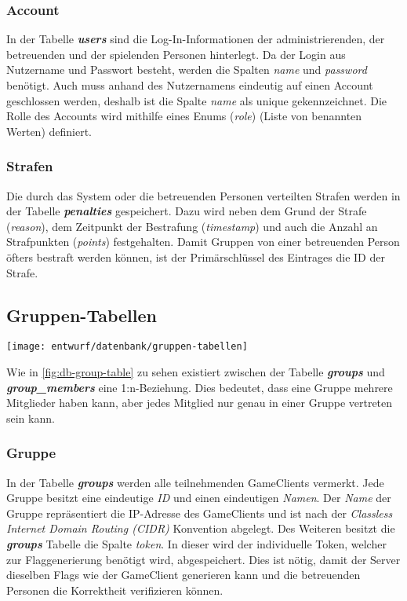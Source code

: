\subsubsection{Account}
In der Tabelle \textbf{\textit{users}} sind die Log-In-Informationen der administrierenden, der betreuenden und der spielenden Personen hinterlegt. Da der Login aus Nutzername und Passwort besteht, werden die Spalten \textit{name} und \textit{password} benötigt. Auch muss anhand des Nutzernamens eindeutig auf einen Account geschlossen werden, deshalb ist die Spalte \textit{name} als unique gekennzeichnet. Die Rolle des Accounts wird mithilfe eines Enums (\textit{role}) (Liste von benannten Werten) definiert.

\subsubsection{Strafen}
Die durch das System oder die betreuenden Personen verteilten Strafen werden in der Tabelle \textbf{\textit{penalties}} gespeichert. Dazu wird neben dem Grund der Strafe (\textit{reason}), dem Zeitpunkt der Bestrafung (\textit{timestamp}) und auch die Anzahl an Strafpunkten (\textit{points}) festgehalten. Damit Gruppen von einer betreuenden Person öfters bestraft werden können, ist der Primärschlüssel des Eintrages die ID der Strafe.

\subsection{Gruppen-Tabellen}
\begin{center}
	\texttt{[image: entwurf/datenbank/gruppen-tabellen]}
	\label{fig:db-group-table}
\end{center}

Wie in \autoref{fig:db-group-table} zu sehen existiert zwischen der Tabelle \textbf{\textit{groups}} und \textbf{\textit{group\_members}} eine 1:n-Beziehung. Dies bedeutet, dass eine Gruppe mehrere Mitglieder haben kann, aber jedes Mitglied nur genau in einer Gruppe vertreten sein kann.

\subsubsection{Gruppe}
In der Tabelle \textbf{\textit{groups}} werden alle teilnehmenden GameClients vermerkt. Jede Gruppe besitzt eine eindeutige \textit{ID} und einen eindeutigen \textit{Namen}. Der \textit{Name} der Gruppe repräsentiert die IP-Adresse des GameClients und ist nach der \textit{Classless Internet Domain Routing (CIDR)} Konvention abgelegt. Des Weiteren besitzt die \textbf{\textit{groups}} Tabelle die Spalte \textit{token}. In dieser wird der individuelle Token, welcher zur Flaggenerierung benötigt wird, abgespeichert. Dies ist nötig, damit der Server dieselben Flags wie der GameClient generieren kann und die betreuenden Personen die Korrektheit verifizieren können.

